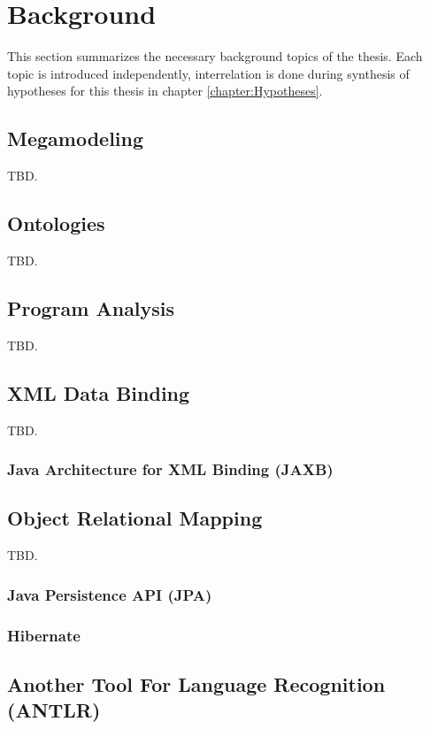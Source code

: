 \chapter{Background}
\label{chapter:Background}
This section summarizes the necessary background topics of the thesis.
Each topic is introduced independently, interrelation is done during synthesis of hypotheses for this thesis in chapter \ref{chapter:Hypotheses}.







\section{Megamodeling}
TBD.

\subsection{\megal}
\subsubsection{\megalxtext}

\section{Ontologies}
TBD.



\section{Program Analysis}
TBD.

\section{XML Data Binding}
TBD.


\subsection{Java Architecture for XML Binding (JAXB)}

\section{Object Relational Mapping}
TBD.



\subsection{Java Persistence API (JPA)}

\subsection{Hibernate}



\section{Another Tool For Language Recognition (ANTLR)}

